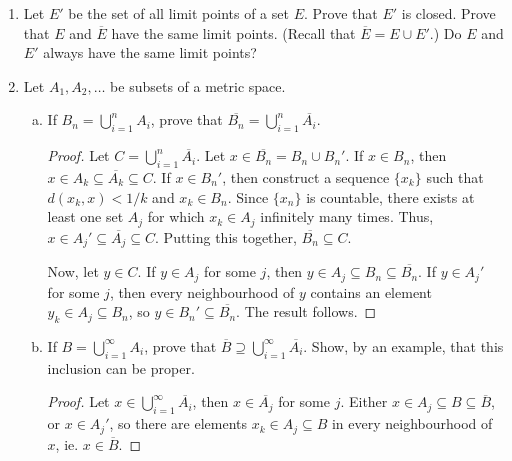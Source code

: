 \begin{enumerate}
\begin{proof}
Let $y \not\in \{0, 1, 2\}$. Consider $k \in \{0, 1, 2\}$. If $y < k$ or $y > k + 1$, then taking some radius smaller than the distance to $[k, k + 1]$ fails. Otherwise, we have $y - k \in [1/(n+1), 1/(n-1)]$ for some $n$. Taking a radius smaller than the distance to the nearest of the three points $k + 1/(n+1), k + 1/n, k + 1/(n-1)$ fails.
\end{proof}

\item %
Let $E'$ be the set of all limit points of a set $E$. Prove that $E'$ is closed. Prove that $E$ and $\overline{E}$ have the same limit points. (Recall that $\overline{E} = E \cup E'$.) Do $E$ and $E'$ always have the same limit points?

\item %
Let $A_1, A_2, \dotsc$ be subsets of a metric space.
\begin{enumerate}[(a)]
\item If $B_n = \bigcup_{i=1}^{n} A_i$, prove that $\overline{B_n} = \bigcup_{i=1}^{n} \overline{A_i}$. 

\begin{proof}
Let $C = \bigcup_{i=1}^{n} \overline{A_i}$. Let $x \in \overline{B_n} = B_n \cup B_n'$. If $x \in B_n$, then $x \in A_k \subseteq \overline{A_k} \subseteq C$. If $x \in B_n'$, then construct a sequence $\{x_k\}$ such that $d(x_k, x) < 1/k$ and $x_k \in B_n$. Since $\{x_n\}$ is countable, there exists at least one set $A_j$ for which $x_k \in A_j$ infinitely many times. Thus, $x \in A_j' \subseteq \overline{A_j} \subseteq C$. Putting this together, $\overline{B_n} \subseteq C$.

Now, let $y \in C$. If $y \in A_j$ for some $j$, then $y \in A_j \subseteq B_n \subseteq \overline{B_n}$. If $y \in A_j'$ for some $j$, then every neighbourhood of $y$ contains an element $y_k \in A_j \subseteq B_n$, so $y \in B_n' \subseteq \overline{B_n}$. The result follows.
\end{proof}

\item If $B = \bigcup_{i=1}^{\infty} A_i$, prove that $\overline{B} \supseteq \bigcup_{i=1}^{\infty} \overline{A_i}$. Show, by an example, that this inclusion can be proper.
\begin{proof}
Let $x \in \bigcup_{i=1}^{\infty} \overline{A_i}$, then $x \in \overline{A_j}$ for some $j$. Either $x \in A_j \subseteq B \subseteq \overline{B}$, or $x \in A_j'$, so there are elements $x_k \in A_j \subseteq B$ in every neighbourhood of $x$, ie. $x \in \overline{B}$.


\end{proof}
\end{enumerate}
\end{enumerate}
